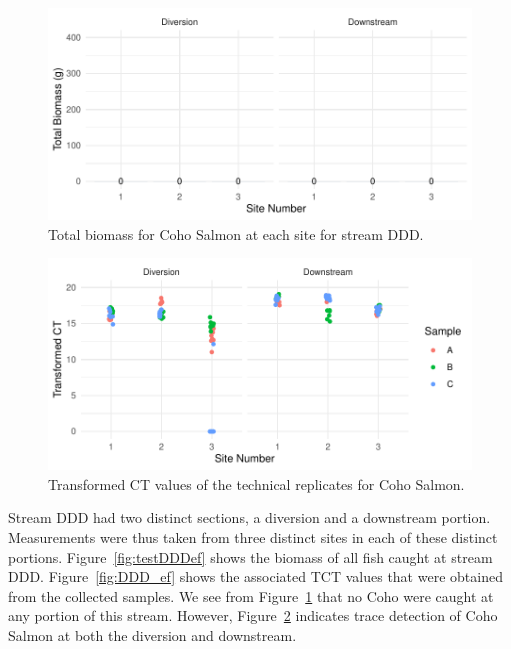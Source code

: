 \begin{figure}[H]
\centering
\includegraphics{Chapter5Images/DDD_Co_new.pdf}
\caption{  \hspace{1mm}Total biomass for Coho Salmon at each site for stream DDD.}
\label{fig:testDDDco}
\end{figure}





\begin{figure}[H]
\centering
\includegraphics{Chapter5Images/DDD_co_tct.pdf}
\caption{ \hspace{1mm} Transformed CT values of the technical replicates for Coho Salmon.}
\label{fig:DDD_co}
\end{figure}


Stream DDD had two distinct sections, a diversion and a downstream portion. Measurements were thus taken from three distinct sites in each of these distinct portions.
Figure~\ref{fig:testDDDef} shows the biomass of all fish caught at stream DDD. Figure~\ref{fig:DDD_ef} shows the associated TCT values that were obtained from the collected samples.
We see from Figure~\ref{fig:testDDDco} that no Coho were caught at any portion of this stream. However, Figure~\ref{fig:DDD_co} indicates trace detection of Coho Salmon at both the diversion and downstream.



